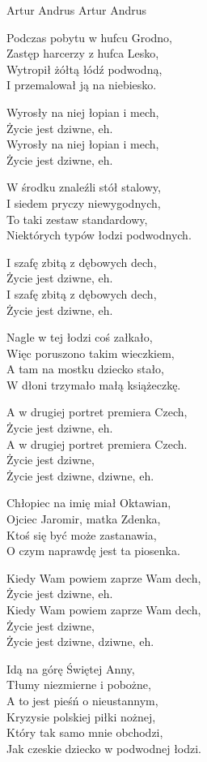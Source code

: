 {Artur Andrus}
{Artur Andrus}
\begin{text}
Podczas pobytu w hufcu Grodno,\\
Zastęp harcerzy z hufca Lesko,\\
Wytropił żółtą łódź podwodną,\\
I przemalował ją na niebiesko.

Wyrosły na niej łopian i mech,\\
Życie jest dziwne, eh.\\
Wyrosły na niej łopian i mech,\\
Życie jest dziwne, eh.

W środku znaleźli stół stalowy,\\
I siedem pryczy niewygodnych,\\
To taki zestaw standardowy,\\
Niektórych typów łodzi podwodnych.

I szafę zbitą z dębowych dech,\\
Życie jest dziwne, eh.\\
I szafę zbitą z dębowych dech,\\
Życie jest dziwne, eh.

Nagle w tej łodzi coś załkało,\\
Więc poruszono takim wieczkiem,\\
A tam na mostku dziecko stało,\\
W dłoni trzymało małą książeczkę.

A w drugiej portret premiera Czech,\\
Życie jest dziwne, eh.\\
A w drugiej portret premiera Czech.\\
Życie jest dziwne, \\
Życie jest dziwne, dziwne, eh.

Chłopiec na imię miał Oktawian,\\
Ojciec Jaromir, matka Zdenka,\\
Ktoś się być może zastanawia,\\
O czym naprawdę jest ta piosenka.

Kiedy Wam powiem zaprze Wam dech,\\
Życie jest dziwne, eh.\\
Kiedy Wam powiem zaprze Wam dech,\\
Życie jest dziwne, \\
Życie jest dziwne, dziwne, eh.

Idą na górę Świętej Anny,\\
Tłumy niezmierne i pobożne,\\
A to jest pieśń o nieustannym,\\
Kryzysie polskiej piłki nożnej,\\
Który tak samo mnie obchodzi,\\
Jak czeskie dziecko w podwodnej łodzi.


\end{text}
